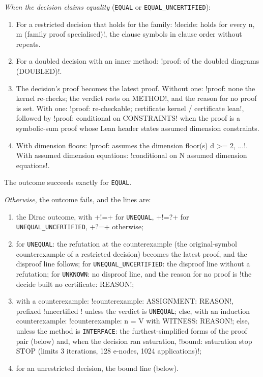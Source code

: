 \begin{algorithm}\label{alg:language-decide}
\leavevmode
\emph{When the decision claims equality} (\texttt{EQUAL} or \texttt{EQUAL\_UNCERTIFIED}):
\begin{enumerate}
\item For a restricted decision that holds for the family: \code!decide: holds for every n, m (family proof specialised)!, the clause symbols in clause order without repeats.
\item For a doubled decision with an inner method: \code!proof: of the doubled diagrams (DOUBLED)!.
\item The decision's proof becomes the latest proof. Without one: \code!proof: none the kernel re-checks; the verdict rests on METHOD!, and the reason for no proof is set. With one: \code!proof: re-checkable; certificate kernel / certificate lean!, followed by \code!proof: conditional on CONSTRAINTS! when the proof is a symbolic-sum proof whose Lean header states assumed dimension constraints.
\item With dimension floors: \code!proof: assumes the dimension floor(s) d >= 2, ...!. With assumed dimension equations: \code!conditional on N assumed dimension equations!.
\end{enumerate}
The outcome succeeds exactly for \texttt{EQUAL}.

\emph{Otherwise}, the outcome fails, and the lines are:
\begin{enumerate}
\item the Dirac outcome, with \code+!=+ for \texttt{UNEQUAL}, \code+!=?+ for \texttt{UNEQUAL\_UNCERTIFIED}, \code+?=+ otherwise;
\item for \texttt{UNEQUAL}: the refutation at the counterexample (the original-symbol counterexample of a restricted decision) becomes the latest proof, and the disproof line follows; for \texttt{UNEQUAL\_UNCERTIFIED}: the disproof line without a refutation; for \texttt{UNKNOWN}: no disproof line, and the reason for no proof is \code!the decide built no certificate: REASON!;
\item with a counterexample: \code!counterexample: ASSIGNMENT: REASON!, prefixed \code!uncertified ! unless the verdict is \texttt{UNEQUAL}; else, with an induction counterexample: \code!counterexample: n = V with WITNESS: REASON!; else, unless the method is \texttt{INTERFACE}: the furthest-simplified forms of the proof pair (below) and, when the decision ran saturation, \code!bound: saturation stop STOP (limits 3 iterations, 128 e-nodes, 1024 applications)!;
\item for an unrestricted decision, the bound line (below).
\end{enumerate}
\end{algorithm}

